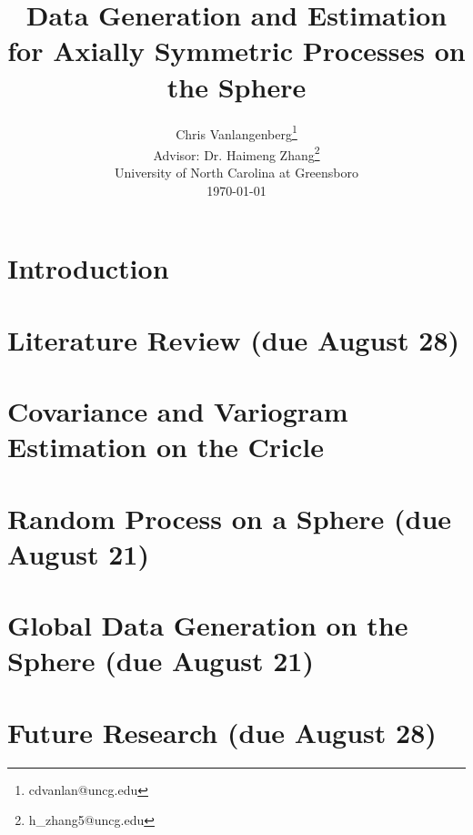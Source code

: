 
\usepackage{graphicx}

\usepackage{Sweave}




\title{{\bf\Large Data Generation and Estimation for Axially Symmetric Processes on the Sphere }}


\author{Chris Vanlangenberg\footnote{cdvanlan@uncg.edu} \\
\bigskip
Advisor: Dr. Haimeng Zhang\footnote{h\_zhang5@uncg.edu}\\ \small{University of North Carolina at Greensboro}\\
\small \today}

\maketitle 
\thispagestyle{empty}



\newpage
\chapter{Introduction}


\chapter{Literature Review (due August 28)}



\chapter{Covariance and Variogram Estimation on the Cricle}


\chapter{Random Process on a Sphere (due August 21) }


\chapter{Global Data Generation on the Sphere (due August 21)}


\chapter{Future Research (due August 28)}




